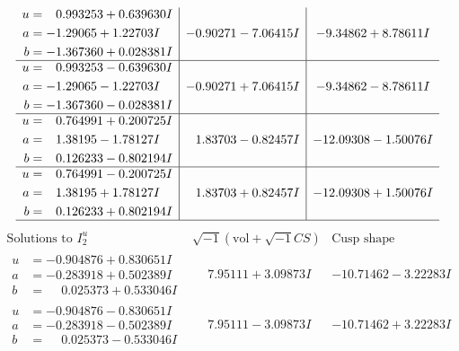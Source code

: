 \documentclass[1p]{elsarticle_modified}
\theoremstyle{definition}
\newcommand{\I}{\sqrt{-1}}
\begin{document}
$$\begin{array}{c|c|c}
\begin{aligned}
u &= \phantom{-}0.993253 + 0.639630 I \\
a &= -1.29065 + 1.22703 I \\
b &= -1.367360 + 0.028381 I\end{aligned}
 & -0.90271 - 7.06415 I & -9.34862 + 8.78611 I \\ \hline\begin{aligned}
u &= \phantom{-}0.993253 - 0.639630 I \\
a &= -1.29065 - 1.22703 I \\
b &= -1.367360 - 0.028381 I\end{aligned}
 & -0.90271 + 7.06415 I & -9.34862 - 8.78611 I \\ \hline\begin{aligned}
u &= \phantom{-}0.764991 + 0.200725 I \\
a &= \phantom{-}1.38195 - 1.78127 I \\
b &= \phantom{-}0.126233 - 0.802194 I\end{aligned}
 & \phantom{-}1.83703 - 0.82457 I & -12.09308 - 1.50076 I \\ \hline\begin{aligned}
u &= \phantom{-}0.764991 - 0.200725 I \\
a &= \phantom{-}1.38195 + 1.78127 I \\
b &= \phantom{-}0.126233 + 0.802194 I\end{aligned}
 & \phantom{-}1.83703 + 0.82457 I & -12.09308 + 1.50076 I\\
 \hline 
 \end{array}$$\newpage$$\begin{array}{c|c|c}  
\text{Solutions to }I^u_{2}& \I (\text{vol} + \sqrt{-1}CS) & \text{Cusp shape}\\
 \hline 
\begin{aligned}
u &= -0.904876 + 0.830651 I \\
a &= -0.283918 + 0.502389 I \\
b &= \phantom{-}0.025373 + 0.533046 I\end{aligned}
 & \phantom{-}7.95111 + 3.09873 I & -10.71462 - 3.22283 I \\ \hline\begin{aligned}
u &= -0.904876 - 0.830651 I \\
a &= -0.283918 - 0.502389 I \\
b &= \phantom{-}0.025373 - 0.533046 I\end{aligned}
 & \phantom{-}7.95111 - 3.09873 I & -10.71462 + 3.22283 I \\ \hline\begin{aligned}

\end{aligned}
\end{array}$$
\end{document}
